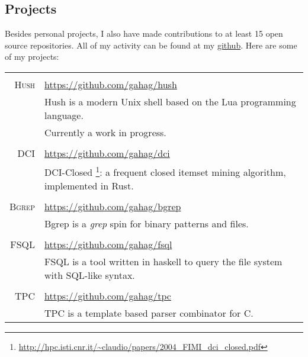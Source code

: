 \documentclass[a4paper,10pt]{article}
\newcommand{\cpp}{C\protect\scalebox{0.8}{\protect\raisebox{0.4ex}{++}}}
\renewcommand\#{\protect\scalebox{0.8}{\protect\raisebox{0.4ex}{\char"0023}}}
\begin{document}
\subsection{Projects}
Besides personal projects, I also have made contributions to at least 15 open source
repositories. All of my activity can be found at my \href{https://github.com/gahag/}{github}.
Here are some of my projects: \\
\begin{tabular}{r|l}
  \multicolumn{2}{c}{} \\
  \textsc{Hush} & \url{https://github.com/gahag/hush} \\[3pt]
  & Hush is a modern Unix shell based on the Lua programming language. \\
  & Currently a work in progress. \\

  \multicolumn{2}{c}{} \\
  \textsc{DCI} & \url{https://github.com/gahag/dci} \\[3pt]
  & DCI-Closed \footnote{\url{http://hpc.isti.cnr.it/~claudio/papers/2004_FIMI_dci_closed.pdf}}:
  a frequent closed itemset mining algorithm, implemented in Rust.  \\

  \multicolumn{2}{c}{} \\
  \textsc{Bgrep} & \url{https://github.com/gahag/bgrep} \\[3pt]
  & Bgrep is a \textit{grep} spin for binary patterns and files. \\

  \multicolumn{2}{c}{} \\
  \textsc{FSQL} & \url{https://github.com/gahag/fsql} \\[3pt]
  & FSQL is a tool written in haskell to query the file system with SQL-like syntax. \\
  
  \multicolumn{2}{c}{} \\
  \textsc{TPC} & \url{https://github.com/gahag/tpc} \\[3pt]
  & TPC is a template based parser combinator for \cpp. \\
\end{tabular}
\end{document}
